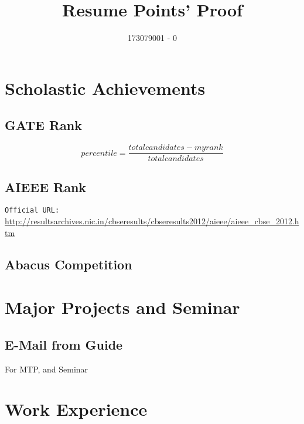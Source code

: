 \documentclass{article}
\title{Resume Points' Proof}
\author{173079001 - 0}
\date{}
\begin{document}
\maketitle
\tableofcontents
\newpage
\section{Scholastic Achievements}
	\subsection{GATE Rank}
		$$percentile = \frac{total candidates - myrank }{total candidates}$$
		\begin{figure}[h]
		\end{figure}

\newpage
	\subsection{AIEEE Rank}
		\texttt{Official URL:} \url{http://resultsarchives.nic.in/cbseresults/cbseresults2012/aieee/aieee_cbse_2012.htm}
		\begin{figure}[h]
		\end{figure}
		
\newpage
	\subsection{Abacus Competition}
		\begin{figure}[h]
		\end{figure}
\newpage
\section{Major Projects and Seminar}
	\subsection{E-Mail from Guide}
		For MTP, and Seminar
		\begin{figure}[h]
		\end{figure}
\newpage
\section{Work Experience}
\end{document}
